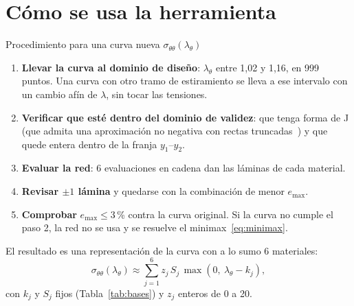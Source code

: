 \section{Cómo se usa la herramienta}
\begin{caja}{Procedimiento para una curva nueva $\sigma_{\theta\theta}(\lambda_\theta)$}
\begin{enumerate}[label=\arabic*.]
\item \textbf{Llevar la curva al dominio de diseño}: $\lambda_\theta$ entre 1,02 y 1,16, en 999 puntos. Una curva con otro tramo de estiramiento se lleva a ese intervalo con un cambio afín de $\lambda$, sin tocar las tensiones.
\item \textbf{Verificar que esté dentro del dominio de validez}: que tenga forma de J (que admita una aproximación no negativa con rectas truncadas~\cite{lawson}) y que quede entera dentro de la franja $y_1$--$y_2$.
\item \textbf{Evaluar la red}: 6 evaluaciones en cadena dan las láminas de cada material.
\item \textbf{Revisar $\pm1$ lámina} y quedarse con la combinación de menor $e_{\max}$.
\item \textbf{Comprobar} $e_{\max}\le3$\,\% contra la curva original. Si la curva no cumple el paso 2, la red no se usa y se resuelve el minimax~\eqref{eq:minimax}.
\end{enumerate}
El resultado es una representación de la curva con a lo sumo 6 materiales:
\[
\sigma_{\theta\theta}(\lambda_\theta)\approx\sum_{j=1}^{6}z_j\,S_j\,\max(0,\ \lambda_\theta-k_j),
\]
con $k_j$ y $S_j$ fijos (Tabla~\ref{tab:bases}) y $z_j$ enteros de 0 a 20.
\end{caja}

